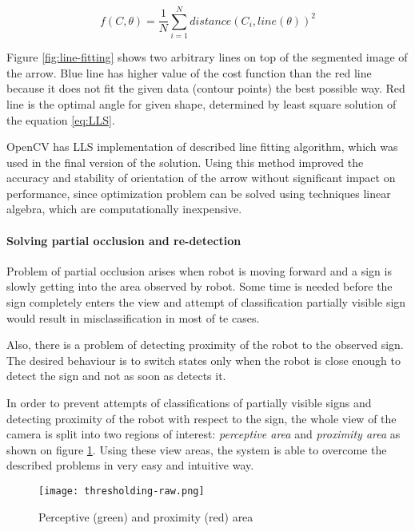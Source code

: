 \begin{equation}
f(C,\theta)=
\frac{1}{N}
\sum_{i=1}^{N}distance(C_i, line(\theta))^2
\label{eq:LLS}
\end{equation}

Figure \ref{fig:line-fitting} shows two arbitrary lines on top of the segmented image of the arrow. Blue line has higher value of the cost function than the red line because it does not fit the given data (contour points) the best possible way. Red line is the optimal angle for given shape, determined by least square solution of the equation \ref{eq:LLS}.

OpenCV has LLS implementation of described line fitting algorithm, which was used in the final version of the solution. Using this method improved the accuracy and stability of orientation of the arrow without significant impact on performance, since optimization problem can be solved using techniques linear algebra, which are computationally inexpensive.

\paragraph{Solving partial occlusion and re-detection}

Problem of partial occlusion arises when robot is moving forward and a sign is slowly getting into the area observed by robot. Some time is needed before the sign completely enters the view and attempt of classification partially visible sign would result in misclassification in most of te cases.

Also, there is a problem of detecting proximity of the robot to the observed sign. The desired behaviour is to switch states only when the robot is close enough to detect the sign and not as soon as detects it.

In order to prevent attempts of classifications of partially visible signs and detecting proximity of the robot with respect to the sign, the whole view of the camera is split into two regions of interest: \textit{perceptive area} and \textit{proximity area} as shown on figure \ref{fig:camera-view-areas}. Using these view areas, the system is able to overcome the described problems in very easy and intuitive way.

\begin{figure}[th!]
	\centering
		\texttt{[image: thresholding-raw.png]}
	\caption{Perceptive (green) and proximity (red) area}
	\label{fig:camera-view-areas}
\end{figure}

